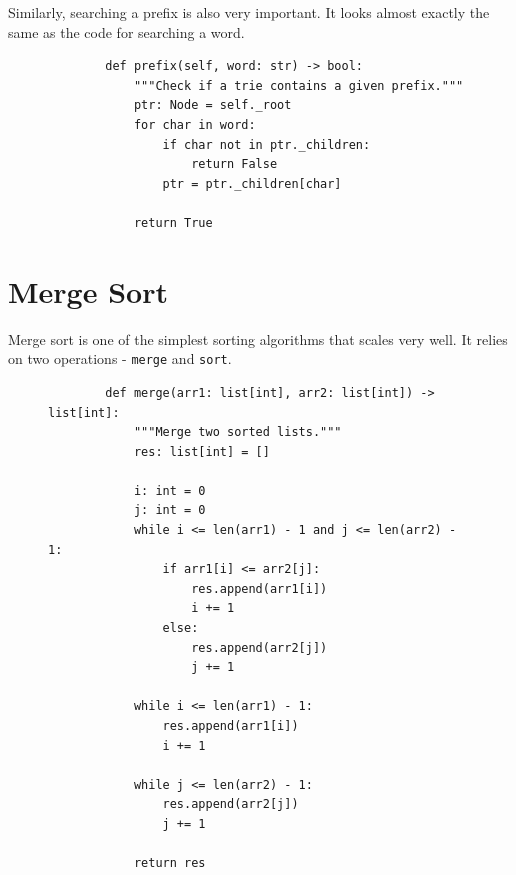 \documentclass[11pt]{article}
\begin{document}
Similarly, searching a prefix is also very important. It looks almost exactly
the same as the code for searching a word.

\begin{figure}[H]
    \centering
    \begin{verbatim}
        def prefix(self, word: str) -> bool:
            """Check if a trie contains a given prefix."""
            ptr: Node = self._root
            for char in word:
                if char not in ptr._children:
                    return False
                ptr = ptr._children[char]

            return True
    \end{verbatim}
\end{figure}


\newpage

\section{Merge Sort}

Merge sort is one of the simplest sorting algorithms that scales very well. It
relies on two operations - \texttt{merge} and \texttt{sort}.

\begin{figure}[H]
    \centering
    \begin{verbatim}
        def merge(arr1: list[int], arr2: list[int]) -> list[int]:
            """Merge two sorted lists."""
            res: list[int] = []

            i: int = 0
            j: int = 0
            while i <= len(arr1) - 1 and j <= len(arr2) - 1:
                if arr1[i] <= arr2[j]:
                    res.append(arr1[i])
                    i += 1
                else:
                    res.append(arr2[j])
                    j += 1
            
            while i <= len(arr1) - 1:
                res.append(arr1[i])
                i += 1

            while j <= len(arr2) - 1:
                res.append(arr2[j])
                j += 1

            return res
    \end{verbatim}
\end{figure}
\end{document}
